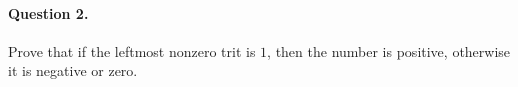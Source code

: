 \paragraph{Question 2.} Prove that if the leftmost nonzero
  trit is \(1\), then the number is positive, otherwise it is
  negative or zero.
